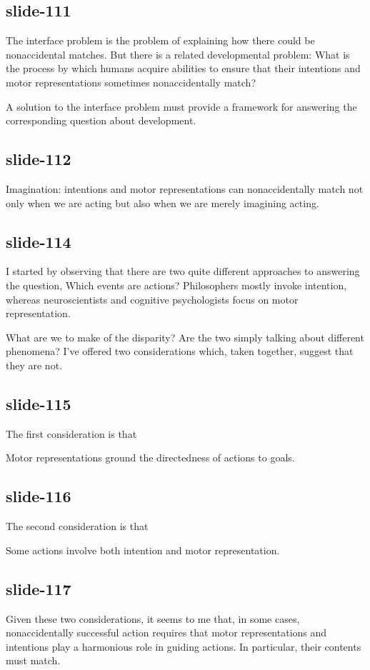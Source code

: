 \documentclass[12pt,\papersize]{extarticle}
\begin{document}
\subsection{slide-111}
The interface problem is the problem of explaining how there could be nonaccidental matches.
But there is a related developmental problem: What is the process by which humans acquire
abilities to ensure that their intentions and motor representations sometimes nonaccidentally
match?
 
A solution to the interface problem must provide a framework for answering the corresponding
question about development.
 
\subsection{slide-112}
Imagination: intentions and motor representations can nonaccidentally match not only
when we are acting but also when we are merely imagining acting.
 
\subsection{slide-114}
I started by observing that there are two quite different approaches to
answering the question, Which events are actions?
Philosophers mostly invoke intention, whereas neuroscientists and cognitive psychologists
focus on motor representation.
 
What are we to make of the disparity? Are the two simply talking about different phenomena?
I’ve offered two considerations which, taken together, suggest that they are not.
 
\subsection{slide-115}
The first consideration is that
 
Motor representations ground the directedness of actions to goals.
 
\subsection{slide-116}
The second consideration is that
 
Some actions involve both intention and motor representation.
 
\subsection{slide-117}
Given these two considerations, it seems to me that, in some cases, nonaccidentally successful
action requires that motor representations and intentions play a harmonious role in
guiding actions.
In particular, their contents must match.
 
\end{document}
